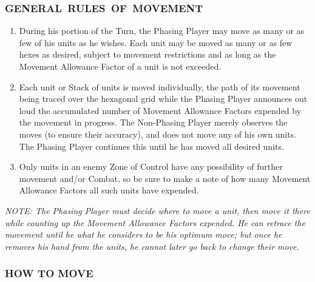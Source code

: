 \subsubsection[GENERAL RULES OF MOVEMENT]{\mbox{GENERAL RULES OF MOVEMENT}}

\begin{enumerate}
  \item During his portion of the Turn, the Phasing Player may move as many or as few of his units as he wishes. Each unit may be moved as many or as few hexes as desired, subject to movement restrictions and as long as the Movement Allowance Factor of a unit is not exceeded.

  \item Each unit or Stack of units is moved individually, the path of its movement being traced over the hexagonal grid while the Phasing Player announces out loud the accumulated number of Movement Allowance Factors expended by the movement in progress. The Non-Phasing Player merely observes the moves (to ensure their accuracy), and does not move any of his own units. The Phasing Player continues this until he has moved all desired units.

  \item Only units in an enemy Zone of Control have any possibility of further movement and/or Combat, so be sure to make a note of how many Movement Allowance Factors all such units have expended.
\end{enumerate}

\textit{NOTE: The Phasing Player must decide where to move a unit, then move it there while counting up the Movement Allowance Factors expended. He can retrace the movement until he what he considers to be his optimum move; but once he removes his hand from the units, he cannot later go back to change their move.}

\subsubsection{HOW TO MOVE}

